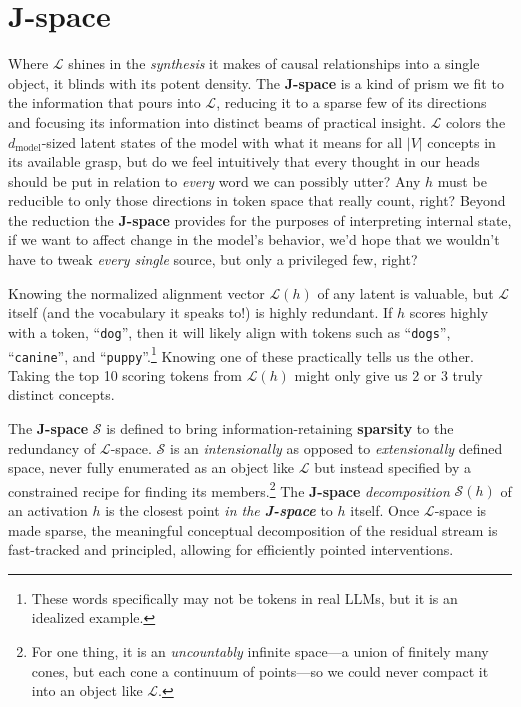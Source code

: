 \documentclass{article}
\newcommand{\jlens}{\mathscr{L}}
\newcommand{\jspace}{\mathscr{S}}
\newcommand{\dmodel}{d_{\text{model}}}
\begin{document}
\section{J-space}\label{sec:jspace}

Where \(\jlens\) shines in the \textit{synthesis} it makes of causal relationships into a single object, it blinds with its potent density. The \textbf{J-space} is a kind of prism we fit to the information that pours into \(\jlens\), reducing it to a sparse few of its directions and focusing its information into distinct beams of practical insight. \(\jlens\) colors the \(\dmodel\)-sized latent states of the model with what it means for all \(|V|\) concepts in its available grasp, but do we feel intuitively that every thought in our heads should be put in relation to \textit{every} word we can possibly utter? Any \(h\) must be reducible to only those directions in token space that really count, right? Beyond the reduction the \textbf{J-space} provides for the purposes of interpreting internal state, if we want to affect change in the model's behavior, we'd hope that we wouldn't have to tweak \textit{every single} source, but only a privileged few, right? 

Knowing the normalized alignment vector \(\jlens(h)\) of any latent is valuable, but \(\jlens\) itself (and the vocabulary it speaks to!) is highly redundant. If \(h\) scores highly with a token, ``\texttt{dog}'', then it will likely align with tokens such as ``\texttt{dogs}'', ``\texttt{canine}'', and ``\texttt{puppy}''.\footnote{These words specifically may not be tokens in real LLMs, but it is an idealized example.} Knowing one of these practically tells us the other. Taking the top 10 scoring tokens from \(\jlens(h)\) might only give us 2 or 3 truly distinct concepts.

The \textbf{J-space} \(\jspace\) is defined to bring information-retaining \textbf{sparsity} to the redundancy of \(\jlens\)-space. \(\jspace\) is an \textit{intensionally} as opposed to \textit{extensionally} defined space, never fully enumerated as an object like \(\jlens\) but instead specified by a constrained recipe for finding its members.\footnote{For one thing, it is an \textit{uncountably} infinite space---a union of finitely many cones, but each cone a continuum of points---so we could never compact it into an object like \(\jlens\).} The \textbf{J-space} \textit{decomposition} \(\jspace(h)\) of an activation \(h\) is the closest point \textit{in the \textbf{J-space}} to \(h\) itself. Once \(\jlens\)-space is made sparse, the meaningful conceptual decomposition of the residual stream is fast-tracked and principled, allowing for efficiently pointed interventions.
\end{document}
